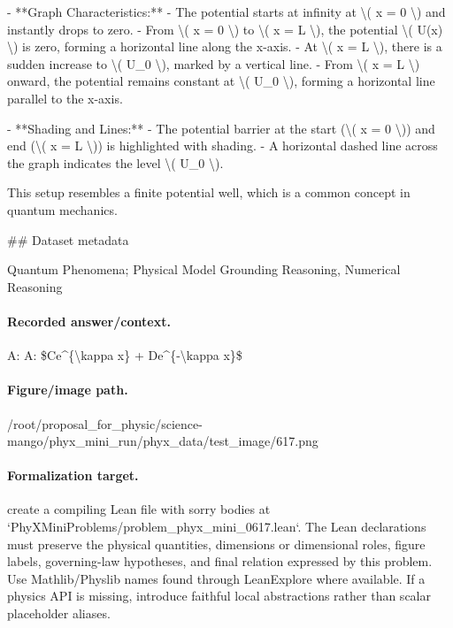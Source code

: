 - **Graph Characteristics:**
  - The potential starts at infinity at \textbackslash{}( x = 0 \textbackslash{}) and instantly drops to zero.
  - From \textbackslash{}( x = 0 \textbackslash{}) to \textbackslash{}( x = L \textbackslash{}), the potential \textbackslash{}( U(x) \textbackslash{}) is zero, forming a horizontal line along the x-axis.
  - At \textbackslash{}( x = L \textbackslash{}), there is a sudden increase to \textbackslash{}( U\_0 \textbackslash{}), marked by a vertical line.
  - From \textbackslash{}( x = L \textbackslash{}) onward, the potential remains constant at \textbackslash{}( U\_0 \textbackslash{}), forming a horizontal line parallel to the x-axis.

- **Shading and Lines:**
  - The potential barrier at the start (\textbackslash{}( x = 0 \textbackslash{})) and end (\textbackslash{}( x = L \textbackslash{})) is highlighted with shading.
  - A horizontal dashed line across the graph indicates the level \textbackslash{}( U\_0 \textbackslash{}). 

This setup resembles a finite potential well, which is a common concept in quantum mechanics.

\#\# Dataset metadata

Quantum Phenomena; Physical Model Grounding Reasoning, Numerical Reasoning

\paragraph{Recorded answer/context.}
A: A: \$Ce\textasciicircum{}\{\textbackslash{}kappa x\} + De\textasciicircum{}\{-\textbackslash{}kappa x\}\$

\paragraph{Figure/image path.}
/root/proposal\_for\_physic/science-mango/phyx\_mini\_run/phyx\_data/test\_image/617.png

\paragraph{Formalization target.}
create a compiling Lean file with sorry bodies at `PhyXMiniProblems/problem\_phyx\_mini\_0617.lean`. The Lean declarations must preserve the physical quantities, dimensions or dimensional roles, figure labels, governing-law hypotheses, and final relation expressed by this problem.
Use Mathlib/Physlib names found through LeanExplore where available. If a physics API is missing, introduce faithful local abstractions rather than scalar placeholder aliases.

